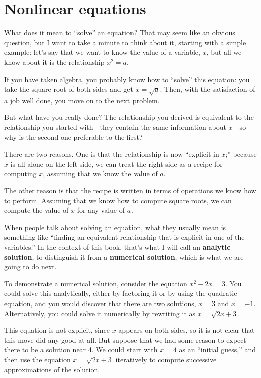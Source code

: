 \documentclass{book}
\begin{document}
\section{Nonlinear equations}

What does it mean to ``solve'' an equation?  That may seem like an
obvious question, but I want to take a minute to think about it,
starting with a simple example: let's say that we want to know the
value of a variable, $x$, but all we know about it is the relationship
$x^2 = a$.

If you have taken algebra, you probably know how to ``solve'' this
equation: you take the square root of both sides and get
$x = \sqrt{a}$.  Then, with the satisfaction of a job well done,
you move on to the next problem.

But what have you really done?  The relationship you derived is
equivalent to the relationship you started with---they contain the
same information about $x$---so why is the second one preferable
to the first?

There are two reasons.  One is that the relationship is now ``explicit
in $x$;'' because $x$ is all alone on the left side, we can treat
the right side as a recipe for computing $x$, assuming that we
know the value of $a$.

The other reason is that the recipe is written in terms of operations
we know how to perform.  Assuming that we know how to compute square
roots, we can compute the value of $x$ for any value of $a$.

When people talk about solving an equation, what they usually mean
is something like ``finding an equivalent relationship that is
explicit in one of the variables.''  In the context of this book,
that's what I will call an {\bf analytic solution}, to distinguish
it from a {\bf numerical solution}, which is what we are going to
do next.

To demonstrate a numerical solution, consider the equation $x^2 - 2x =
3$.  You could solve this analytically, either by factoring it or by
using the quadratic equation, and you would discover that there are
two solutions, $x=3$ and $x=-1$.  Alternatively, you could solve it
numerically by rewriting it as $x = \sqrt{2x+3}$.

This equation is not explicit, since $x$ appears on both sides, so
it is not clear that this move did any good at all.  But suppose
that we had some reason to expect there to be a solution near 4.
We could start with $x=4$ as an ``initial guess,'' and then use
the equation $x = \sqrt{2x+3}$ iteratively to compute successive
approximations of the solution.
\end{document}
